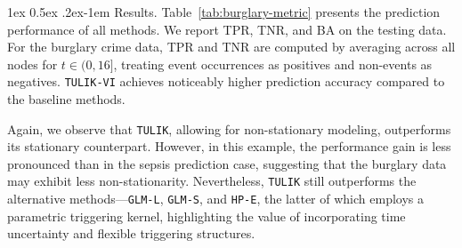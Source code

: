\documentclass[11pt]{article}
\makeatletter
\theoremstyle{remark}
\theoremstyle{plain}
\renewcommand{\paragraph}{%
  \@startsection{paragraph}{4}%
  {\z@}{1ex \@plus 0.5ex \@minus .2ex}{-1em}%
  {\normalfont\normalsize\itshape}%
}
\makeatother
\begin{document}

\paragraph{Results.} 
Table~\ref{tab:burglary-metric} presents the prediction performance of all methods. We report TPR, TNR, and BA on the testing data. For the burglary crime data, TPR and TNR are computed by averaging across all nodes for $t \in (0, 16]$, treating event occurrences as positives and non-events as negatives. \texttt{TULIK-VI} achieves noticeably higher prediction accuracy compared to the baseline methods.

Again, we observe that \texttt{TULIK}, allowing for non-stationary modeling, outperforms its stationary counterpart. However, in this example, the performance gain is less pronounced than in the sepsis prediction case, suggesting that the burglary data may exhibit less non-stationarity. Nevertheless, \texttt{TULIK} still outperforms the alternative methods—\texttt{GLM-L}, \texttt{GLM-S}, and \texttt{HP-E}, the latter of which employs a parametric triggering kernel, highlighting the value of incorporating time uncertainty and flexible triggering structures.



\end{document}
